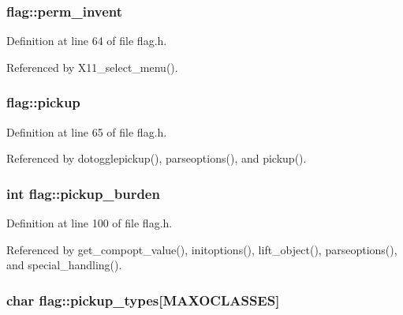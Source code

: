 \hypertarget{structflag_a678425f43c32a2f4fae46534b1904f1c}{
\subsubsection[{perm\+\_\+invent}]{ flag\+::perm\+\_\+invent}}\label{structflag_a678425f43c32a2f4fae46534b1904f1c}


Definition at line 64 of file flag.\+h.



Referenced by X11\+\_\+select\+\_\+menu().

\hypertarget{structflag_a78d01402f1561986cbae615d8a62bd25}{
\subsubsection[{pickup}]{ flag\+::pickup}}\label{structflag_a78d01402f1561986cbae615d8a62bd25}


Definition at line 65 of file flag.\+h.



Referenced by dotogglepickup(), parseoptions(), and pickup().

\hypertarget{structflag_aa9b137c717124f991e9db76dea705a7d}{
\subsubsection[{pickup\+\_\+burden}]{\setlength{\rightskip}{0pt plus 5cm}int flag\+::pickup\+\_\+burden}}\label{structflag_aa9b137c717124f991e9db76dea705a7d}


Definition at line 100 of file flag.\+h.



Referenced by get\+\_\+compopt\+\_\+value(), initoptions(), lift\+\_\+object(), parseoptions(), and special\+\_\+handling().

\hypertarget{structflag_a9f5bdc61a0cc269e6631f79e19fced46}{
\subsubsection[{pickup\+\_\+types}]{\setlength{\rightskip}{0pt plus 5cm}char flag\+::pickup\+\_\+types\mbox{[}{\bf M\+A\+X\+O\+C\+L\+A\+S\+S\+E\+S}\mbox{]}}}\label{structflag_a9f5bdc61a0cc269e6631f79e19fced46}


